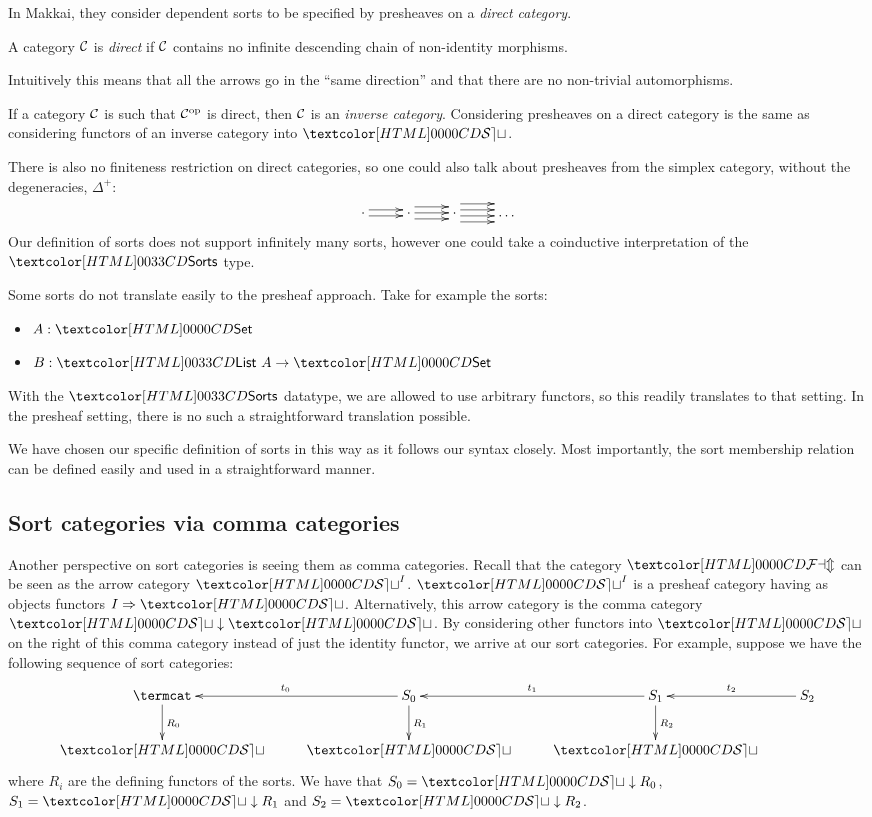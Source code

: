 In Makkai, they consider dependent sorts to be specified by presheaves
on a \emph{direct category}.
\begin{definition}
  A category $\mathcal{C}$ is \emph{direct} if $\mathcal{C}$ contains no infinite
  descending chain of non-identity morphisms.
\end{definition}
Intuitively this means that all the arrows go in the ``same
direction'' and that there are no non-trivial automorphisms.

If a category $\mathcal{C}$ is such that ${\mathcal{C}}^{\mathrm{op}}$ is direct, then $\mathcal{C}$
is an \emph{inverse category}. Considering presheaves on a direct
category is the same as considering functors of an inverse category
into $\SET$.

There is also no finiteness restriction on direct categories, so one
could also talk about presheaves from the simplex category, without
the degeneracies, $\Delta^+$:
$$
\xymatrix{
\cdot     
\ar@<-.5ex>[r]
\ar@<.5ex>[r]
&\cdot
\ar@<-1ex>[r]
\ar@<0ex>[r]
\ar@<1ex>[r]
&\cdot
\ar@<-1.5ex>[r]
\ar@<-.5ex>[r]
\ar@<.5ex>[r]
\ar@<1.5ex>[r]
&\hdots
}
$$
Our definition of sorts does not support infinitely many sorts,
however one could take a coinductive interpretation of the $\sortsty$
type.

Some sorts do not translate easily to the presheaf approach. Take for
example the sorts:
\begin{itemize}
\item $A : \Set$
\item $B : \List\ A \to \Set$
\end{itemize}
With the $\sortsty$ datatype, we are allowed to use arbitrary
functors, so this readily translates to that setting. In the presheaf
setting, there is no such a straightforward translation possible.

We have chosen our specific definition of sorts in this way as it
follows our syntax closely. Most importantly, the sort membership
relation can be defined easily and used in a straightforward manner.

\subsection{Sort categories via comma categories}

Another perspective on sort categories is seeing them as comma
categories. Recall that the category $\FAM$ can be seen as the arrow
category $\SET^I$. $\SET^I$ is a presheaf category having as objects
functors $\Func{I}{\SET}$. Alternatively, this arrow category is the
comma category $\SET \downarrow \SET$. By considering other functors
into $\SET$ on the right of this comma category instead of just the
identity functor, we arrive at our sort categories. For example,
suppose we have the following sequence of sort categories:
$$
\xymatrix{
\termcat
\ar[d]^{R_0}
&S_0
\ar[d]^{R_1}
\ar[l]_{t_0}
&S_1
\ar[d]^{R_2}
\ar[l]_{t_1}
&S_2
\ar[l]_{t_2} \\
\SET
&\SET
&\SET
}
$$
where $R_i$ are the defining functors of the sorts. We have that
$S_0 = \SET \downarrow R_0$, $S_1 = \SET \downarrow R_1$ and
$S_2 = \SET \downarrow R_2$.

